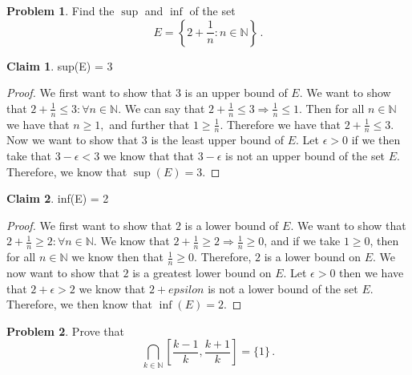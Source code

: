 \documentclass[11pt]{article}
\theoremstyle{definition}
\newtheorem{problem}{Problem}
\newtheorem{claim}{Claim}
\newcommand{\N}{\mathbb{N}}
\begin{document}
\pagebreak

\begin{problem}
Find the $\sup$ and $\inf$ of the set 
\[
E = \left\{ 2 + \frac{1}{n} : n \in \N \right\} \,. 
\]
\end{problem}

\begin{claim}
sup(E) = 3
\end{claim}
\begin{proof}
We first want to show that $3$ is an upper bound of $E.$ We want to show that $2+\frac{1}{n} \leq 3: \forall n\in \mathbb{N}$. We can say that $2+\frac{1}{n}\leq 3 \Rightarrow \frac{1}{n}\leq 1.$ Then for all $n\in \mathbb{N}$ we have that $n\geq 1,$ and further that $1\geq \frac{1}{n}.$ Therefore we have that $2+\frac{1}{n}\leq 3.$ Now we want to show that $3$ is the least upper bound of $E$. Let $\epsilon > 0$ if we then take that $3-\epsilon < 3$ we know that that $3-\epsilon$ is not an upper bound of the set $E$. Therefore, we know that $\sup(E)=3.$
\end{proof}
\begin{claim}
inf(E) = 2
\end{claim}
\begin{proof}
We first want to show that $2$ is a lower bound of $E$. We want to show that $2+\frac{1}{n}\geq 2: \forall n\in \N$. We know that $2+\frac{1}{n}\geq 2\Rightarrow \frac{1}{n}\geq 0$, and if we take $1\geq 0$, then for all $n\in \N$ we know then that $\frac{1}{n}\geq 0$. Therefore, $2$ is a lower bound on $E$. We now want to show that $2$ is a greatest lower bound on $E$. Let $\epsilon > 0$ then we have that $2+\epsilon > 2 $ we know that $2+epsilon$ is not a lower bound of the set $E$. Therefore, we then know that $\inf(E) = 2.$
\end{proof}


\pagebreak

\begin{problem}
Prove that
\[
\bigcap_{k \in \N} \left[ \frac{k-1}{k} , \frac{k +1}{k} \right] = \{ 1 \} \,. 
\]

\end{problem}
\end{document}
